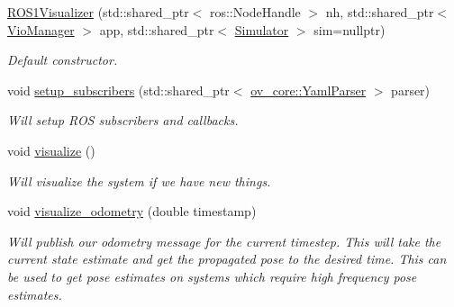 \begin{DoxyCompactItemize}
\item 
\hyperlink{classov__msckf_1_1ROS1Visualizer_abd76c037fd103010fcdb74d2d9f9e391}{R\+O\+S1\+Visualizer} (std\+::shared\+\_\+ptr$<$ ros\+::\+Node\+Handle $>$ nh, std\+::shared\+\_\+ptr$<$ \hyperlink{classov__msckf_1_1VioManager}{Vio\+Manager} $>$ app, std\+::shared\+\_\+ptr$<$ \hyperlink{classov__msckf_1_1Simulator}{Simulator} $>$ sim=nullptr)
\begin{DoxyCompactList}\small\item\em Default constructor. \end{DoxyCompactList}\item 
void \hyperlink{classov__msckf_1_1ROS1Visualizer_a4e2e37124ca201ce654ff0b0b60ad3c2}{setup\+\_\+subscribers} (std\+::shared\+\_\+ptr$<$ \hyperlink{classov__core_1_1YamlParser}{ov\+\_\+core\+::\+Yaml\+Parser} $>$ parser)
\begin{DoxyCompactList}\small\item\em Will setup R\+OS subscribers and callbacks. \end{DoxyCompactList}\item 
\mbox{\label{classov__msckf_1_1ROS1Visualizer_af1b81d6404be911527608c6564b031de}} 
void \hyperlink{classov__msckf_1_1ROS1Visualizer_af1b81d6404be911527608c6564b031de}{visualize} ()
\begin{DoxyCompactList}\small\item\em Will visualize the system if we have new things. \end{DoxyCompactList}\item 
\mbox{\label{classov__msckf_1_1ROS1Visualizer_ae3f4eb0a391d47c3bd811cb43935b9bc}} 
void \hyperlink{classov__msckf_1_1ROS1Visualizer_ae3f4eb0a391d47c3bd811cb43935b9bc}{visualize\+\_\+odometry} (double timestamp)
\begin{DoxyCompactList}\small\item\em Will publish our odometry message for the current timestep. This will take the current state estimate and get the propagated pose to the desired time. This can be used to get pose estimates on systems which require high frequency pose estimates. \end{DoxyCompactList}\item 
\mbox{\label{classov__msckf_1_1ROS1Visualizer_a08dbac86db9d9e7bfb80a1a10202df9e}} 

\end{DoxyCompactItemize}
